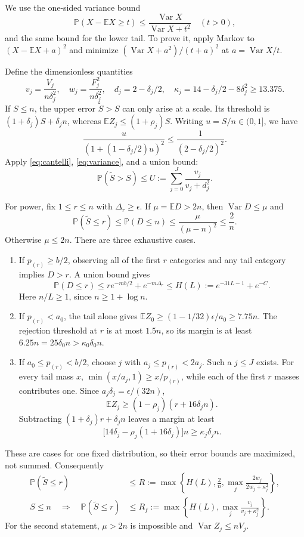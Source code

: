 \documentclass[10pt]{article}
\newcommand{\E}{\mathbb E}
\newcommand{\Prb}{\mathbb P}
\newcommand{\Var}{\operatorname{Var}}
\begin{document}
We use the one-sided variance bound
\begin{equation}\label{eq:cantelli}
 \Prb(X-\E X\ge t)\le\frac{\Var X}{\Var X+t^2}\quad(t>0),
\end{equation}
and the same bound for the lower tail. To prove it, apply Markov to
$(X-\E X+a)^2$ and minimize $(\Var X+a^2)/(t+a)^2$ at
$a=\Var X/t$.

Define the dimensionless quantities
\[
 v_j=\frac{V_j}{n\delta_j^2},\quad w_j=\frac{F_j^2}{n\delta_j^2},\quad
 d_j=2-\delta_j/2,\quad \kappa_j=14-\delta_j/2-8\delta_j^2\ge13.375.
\]
If $S\le n$, the upper error $\widetilde S>S$ can only arise at a scale.
Its threshold is $(1+\delta_j)S+\delta_jn$, whereas
$\E Z_j\le(1+\rho_j)S$. Writing $u=S/n\in(0,1]$, we have
\[
 \frac{u}{(1+(1-\delta_j/2)u)^2}\le\frac1{(2-\delta_j/2)^2}.
\]
Apply \eqref{eq:cantelli}, \eqref{eq:variance}, and a union bound:
\begin{equation}\label{eq:upperbound}
 \Prb(\widetilde S>S)\le U:=\sum_{j=0}^J\frac{v_j}{v_j+d_j^2}.
\end{equation}

For power, fix $1\le r\le n$ with $\Delta_r\ge\epsilon$.
If $\mu=\E D>2n$, then $\Var D\le\mu$ and
\begin{equation}\label{eq:largeocc}
 \Prb(\widetilde S\le r)\le\Prb(D\le n)
 \le\frac\mu{(\mu-n)^2}\le\frac2n.
\end{equation}
Otherwise $\mu\le2n$. There are three exhaustive cases.
\begin{enumerate}
\item If $p_{(r)}\ge b/2$, observing all of the first $r$ categories and
any tail category implies $D>r$. A union bound gives
\begin{equation}\label{eq:heavy}
 \Prb(D\le r)\le r e^{-mb/2}+e^{-m\Delta_r}
 \le H(L):=e^{-31L-1}+e^{-C}.
\end{equation}
Here $n/L\ge1$, since $n\ge1+\log n$.
\item If $p_{(r)}<a_0$, the tail alone gives
$\E Z_0\ge(1-1/32)\epsilon/a_0\ge7.75n$.
The rejection threshold at $r$ is at most $1.5n$, so its margin is at least
$6.25n=25\delta_0n>\kappa_0\delta_0n$.
\item If $a_0\le p_{(r)}<b/2$, choose $j$ with
$a_j\le p_{(r)}<2a_j$. Such a $j\le J$ exists. For every tail mass $x$,
$\min(x/a_j,1)\ge x/p_{(r)}$, while each of the first $r$ masses
contributes one. Since $a_j\delta_j=\epsilon/(32n)$,
\[
 \E Z_j\ge(1-\rho_j)(r+16\delta_j n).
\]
Subtracting $(1+\delta_j)r+\delta_jn$ leaves a margin at least
\[
 \bigl[14\delta_j-\rho_j(1+16\delta_j)\bigr]n
 \ge\kappa_j\delta_jn.
\]
\end{enumerate}
These are cases for one fixed distribution, so their error bounds are
maximized, not summed. Consequently
\begin{align}
 \Prb(\widetilde S\le r)&\le R:=
 \max\left\{H(L),\frac2n,\max_j\frac{2w_j}{2w_j+\kappa_j^2}\right\},
 \label{eq:powergeneral}\\
 S\le n\quad\Longrightarrow\quad
 \Prb(\widetilde S\le r)&\le R_f:=
 \max\left\{H(L),\max_j\frac{v_j}{v_j+\kappa_j^2}\right\}.
 \label{eq:powerfinite}
\end{align}
For the second statement, $\mu>2n$ is impossible and
$\Var Z_j\le nV_j$.
\end{document}
